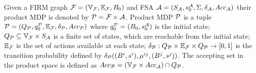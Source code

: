 \documentclass[letterpaper]{article} %
\begin{document}
\begin{definition}
\label{def:pa}
Given a FIRM graph $\mathcal{F} = (\mathbb{V}_{\mathcal{F}}, \mathbb{E}_{\mathcal{F}}, B_0)$ and FSA $\mathcal{A} = (S_{\mathcal{A}}, s_0^{\mathcal{A}}, \Sigma, \delta_{\mathcal{A}}, Acc_{\mathcal{A}})$ their product MDP is denoted by  $\mathcal{P} = \mathcal{F} \times \mathcal{A}$. Product MDP $\mathcal{P}$
is a tuple $\mathcal{P} = (Q_{\mathcal{P}}, q_0^{\mathcal{P}}, \mathbb{E}_{\mathcal{F}}, \delta_{\mathcal{P}}, Acc_{\mathcal{P}})$ where
$q_0^{\mathcal{P}} = (B_0 , s_0^{\mathcal{A}})$ is the initial state;
$Q_{\mathcal{P}} \subseteq \mathbb{V}_{\mathcal{F}} \times S_{\mathcal{A}} $ is a finite set of states, which are reachable from the initial state; %
$\mathbb{E}_{\mathcal{F}}$ is the set of actions available at each state;
$\delta_{\mathcal{P}} : Q_{\mathcal{P}} \times \mathbb{E}_{\mathcal{F}} \times Q_{\mathcal{P}} \rightarrow [0, 1]$ is the transition probability
defined by $\delta_{\mathcal{P}}((B^i, s^i), \mu^{ij}, (B^j, s^j))$.
The accepting set in the product space is defined as $Acc_{\mathcal{P}} =  (\mathbb{V}_{\mathcal{F}} \times Acc_{\mathcal{A}}) \cap Q_{\mathcal{P}}$.


\end{definition}
\end{document}
